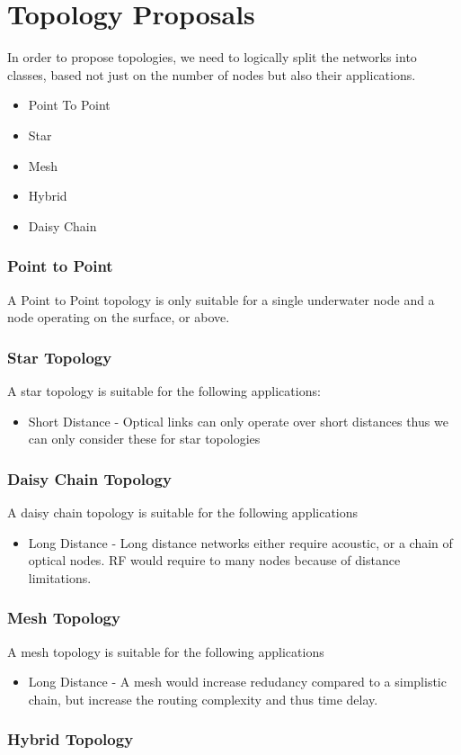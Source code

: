 \section{Topology Proposals}
In order to propose topologies, we need to logically split the networks into
classes, based not just on the number of nodes but also their applications.

\begin{itemize}
\item{Point To Point}
\item{Star}
\item{Mesh}
\item{Hybrid}
\item{Daisy Chain}
\end{itemize}

\subsubsection{Point to Point}
A Point to Point topology is only suitable for a single underwater node and a
node operating on the surface, or above.

\subsubsection{Star Topology}
A star topology is suitable for the following applications:
\begin{itemize}
\item{Short Distance - Optical links can only operate over short distances thus
we can only consider these for star topologies}
\end{itemize}

\subsubsection{Daisy Chain Topology}
A daisy chain topology is suitable for the following applications
\begin{itemize}
\item{Long Distance - Long distance networks either require acoustic,
or a chain of optical nodes. RF would require to many nodes because of distance
limitations.}
\end{itemize}

\subsubsection{Mesh Topology}
A mesh topology is suitable for the following applications
\begin{itemize}
\item{Long Distance - A mesh would increase redudancy compared to a simplistic
chain, but increase the routing complexity and thus time delay.}
\end{itemize}

\subsubsection{Hybrid Topology}



